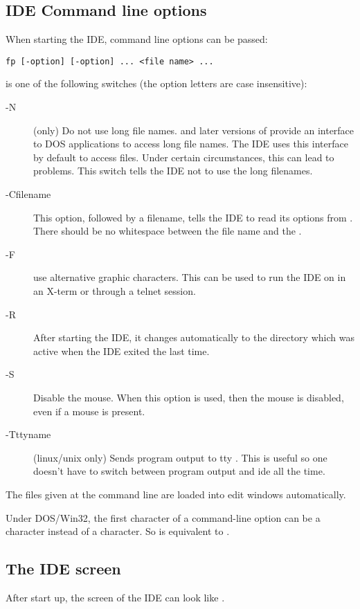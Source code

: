 \subsection{IDE Command line options}
When starting the IDE, command line options can be passed:
\begin{verbatim}
fp [-option] [-option] ... <file name> ...
\end{verbatim}
 is one of the following switches (the option letters
are case insensitive):
\begin{description}
\item [-N] (\dos only) Do not use long file names.  and later
versions of \windows provide an interface to DOS applications to access
long file names.
The IDE uses this interface by default to access files. Under certain
circumstances, this can lead to problems. This switch tells the IDE not to
use the long filenames.
\item [-Cfilename] This option, followed by a filename, tells the IDE to
read its options from . There should be no whitespace between
the file name and the .
\item [-F] use alternative graphic characters. This can be used to run the
IDE on \linux in an X-term or through a telnet session.
\item [-R] After starting the IDE, it changes automatically to the directory
which was active when the IDE exited the last time.
\item [-S] Disable the mouse. When this option is used, then the mouse is
disabled, even if a mouse is present.
\item[-Tttyname] (linux/unix only) Sends program output to tty .
This is useful so one doesn't have to switch between program output and ide
all the time.
\end{description}
The files given at the command line are loaded into edit windows automatically.

\begin{remark}
Under DOS/Win32, the first character of a command-line option can be a \var{/}
character instead of a \var{-} character. So  is equivalent to .
\end{remark}

\subsection{The IDE screen}

After start up, the screen of the IDE can look like .

